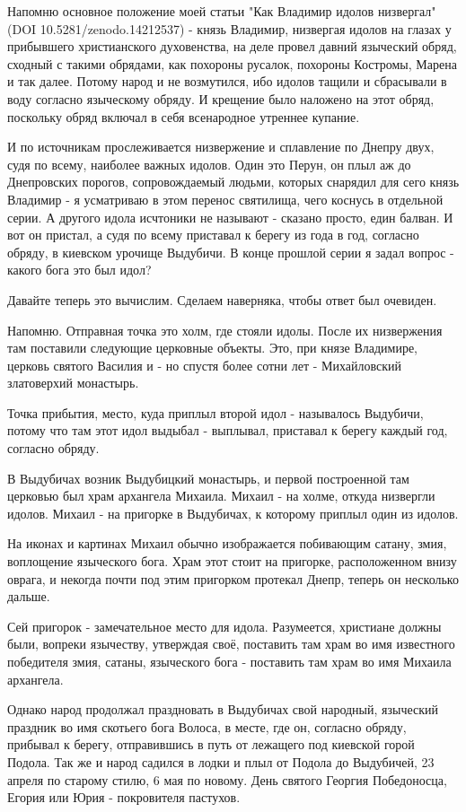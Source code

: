 \documentclass[a5paper,11pt,openany]{article}
\begin{document}
    Напомню основное положение моей статьи "Как Владимир идолов низвергал" (DOI 10.5281/zenodo.14212537) - князь Владимир, низвергая идолов на глазах у прибывшего христианского духовенства, на деле провел давний языческий обряд, сходный с такими обрядами, как похороны русалок, похороны Костромы, Марена и так далее. Потому народ и не возмутился, ибо идолов тащили и сбрасывали в воду согласно языческому обряду. И крещение было наложено на этот обряд, поскольку обряд включал в себя всенародное утреннее купание.

   И по источникам прослеживается низвержение и сплавление по Днепру двух, судя по всему, наиболее важных идолов. Один это Перун, он плыл аж до Днепровских порогов,  сопровождаемый людьми, которых снарядил для сего князь Владимир - я усматриваю в этом перенос святилища, чего коснусь в отдельной серии. А другого идола исчтоники не называют - сказано просто, един балван. И вот он пристал, а судя по всему приставал к берегу из года в год, согласно обряду, в киевском урочище Выдубичи. В конце прошлой серии я задал вопрос - какого бога это был идол?

   Давайте теперь это вычислим. Сделаем наверняка, чтобы ответ был очевиден.

   Напомню. Отправная точка это холм, где стояли идолы. После их низвержения там поставили следующие церковные объекты. Это, при князе Владимире, церковь святого Василия и - но спустя более сотни лет - Михайловский златоверхий монастырь.

    Точка прибытия, место, куда приплыл второй идол - называлось Выдубичи, потому что там этот идол выдыбал - выплывал, приставал к берегу каждый год, согласно обряду. 

   В Выдубичах возник Выдубицкий монастырь, и первой построенной там церковью был храм архангела Михаила. Михаил - на холме, откуда низвергли идолов. Михаил - на пригорке в Выдубичах, к которому приплыл один из идолов.

   На иконах и картинах Михаил обычно изображается побивающим сатану, змия, воплощение языческого бога. Храм этот стоит на пригорке, расположенном внизу оврага, и некогда почти под этим пригорком протекал Днепр, теперь он несколько дальше. 

   Сей пригорок - замечательное место для идола. Разумеется, христиане должны были, вопреки язычеству, утверждая своё, поставить там храм во имя известного победителя змия, сатаны, языческого бога - поставить там храм во имя Михаила архангела.

    Однако народ продолжал праздновать в Выдубичах свой народный, языческий праздник  во имя скотьего бога Волоса, в месте, где он, согласно обряду, прибывал к берегу, отправившись в путь от лежащего под киевской горой Подола. Так же и народ садился в лодки и плыл от Подола до Выдубичей, 23 апреля по старому стилю, 6 мая по новому. День святого Георгия Победоносца, Егория или Юрия - покровителя пастухов. 
\end{document}
